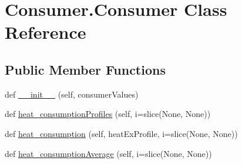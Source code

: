 \hypertarget{class_consumer_1_1_consumer}{}\section{Consumer.\+Consumer Class Reference}
\label{class_consumer_1_1_consumer}
\subsection*{Public Member Functions}
\begin{DoxyCompactItemize}
\item 
def \hyperlink{class_consumer_1_1_consumer_ac4c06a6de40e3415a3e11460a8430be3}{\+\_\+\+\_\+init\+\_\+\+\_\+} (self, consumer\+Values)
\item 
def \hyperlink{class_consumer_1_1_consumer_a50a2be7676f85149dfb01138fa779535}{heat\+\_\+consumption\+Profiles} (self, i=slice(None, None))
\item 
def \hyperlink{class_consumer_1_1_consumer_a25287e5a16d9185b04c419b8899d3380}{heat\+\_\+consumption} (self, heat\+Ex\+Profile, i=slice(None, None))
\item 
def \hyperlink{class_consumer_1_1_consumer_aaedec08d501a0d71638ba308c6b5902e}{heat\+\_\+consumption\+Average} (self, i=slice(None, None))
\end{DoxyCompactItemize}
